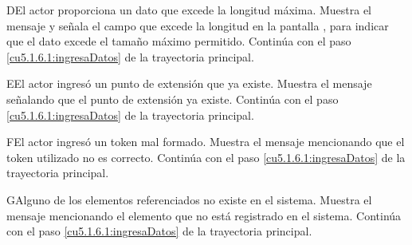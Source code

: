  \begin{UCtrayectoriaA}{D}{El actor proporciona un dato que excede la longitud máxima.}
    \UCpaso[\UCsist] Muestra el mensaje  y señala el campo que excede la 
    longitud en la pantalla , para indicar que el dato excede el tamaño máximo permitido.
    \UCpaso[] Continúa con el paso \ref{cu5.1.6.1:ingresaDatos} de la trayectoria principal.
 \end{UCtrayectoriaA}
 \begin{UCtrayectoriaA}{E}{El actor ingresó un punto de extensión que ya existe.}
    \UCpaso[\UCsist] Muestra el mensaje  señalando que el punto de extensión ya existe.
    \UCpaso[] Continúa con el paso \ref{cu5.1.6.1:ingresaDatos} de la trayectoria principal.
 \end{UCtrayectoriaA}
 \begin{UCtrayectoriaA}{F}{El actor ingresó un token mal formado.}
    \UCpaso[\UCsist] Muestra el mensaje  mencionando que el token utilizado no es correcto.
    \UCpaso[] Continúa con el paso \ref{cu5.1.6.1:ingresaDatos} de la trayectoria principal.
 \end{UCtrayectoriaA}
 \begin{UCtrayectoriaA}{G}{Alguno de los elementos referenciados no existe en el sistema.}
    \UCpaso[\UCsist] Muestra el mensaje  mencionando el elemento que no está registrado en el sistema.
    \UCpaso[] Continúa con el paso \ref{cu5.1.6.1:ingresaDatos} de la trayectoria principal.
 \end{UCtrayectoriaA}
  